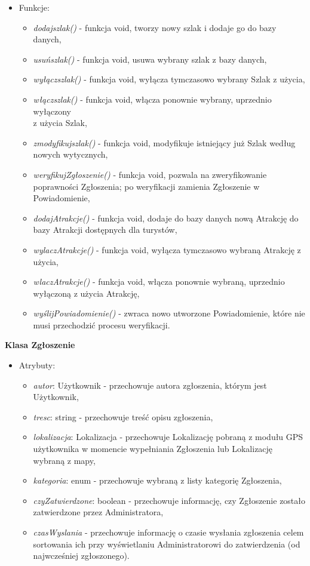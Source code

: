     \begin{itemize}
        \item []Funkcje:
        \begin{itemize}
            \item \textit{dodajszlak()} - funkcja void, tworzy nowy szlak i dodaje go do bazy danych,
            \item \textit{usuńszlak()} - funkcja void, usuwa wybrany szlak z bazy danych,
            \item \textit{wyłączszlak()} - funkcja void, wyłącza tymczasowo wybrany Szlak z użycia,
            \item \textit{włączszlak()} - funkcja void, włącza ponownie wybrany, uprzednio wyłączony \\z użycia Szlak,
            \item \textit{zmodyfikujszlak()} - funkcja void, modyfikuje istniejący już Szlak według nowych wytycznych,
            \item \textit{weryfikujZgłoszenie()} - funkcja void, pozwala na zweryfikowanie poprawności Zgłoszenia; po weryfikacji zamienia Zgłoszenie w Powiadomienie,
            \item \textit{dodajAtrakcje()} - funkcja void, dodaje do bazy danych nową Atrakcję do bazy Atrakcji dostępnych dla turystów,
            \item \textit{wylaczAtrakcje()} - funkcja void, wyłącza tymczasowo wybraną Atrakcję z użycia,
            \item \textit{wlaczAtrakcje()} - funkcja void, włącza ponownie wybraną, uprzednio wyłączoną z użycia Atrakcję,
            \item \textit{wyślijPowiadomienie()} - zwraca nowo utworzone Powiadomienie, które nie musi przechodzić procesu weryfikacji.
        \end{itemize}
    \end{itemize}
    \textbf{Klasa Zgłoszenie} 
    \begin{itemize}
        \item []Atrybuty:
        \begin{itemize}
            \item \textit{autor}: Użytkownik - przechowuje autora zgłoszenia, którym jest Użytkownik,
            \item \textit{tresc}: string - przechowuje treść opisu zgłoszenia,
            \item \textit{lokalizacja}: Lokalizacja - przechowuje Lokalizację pobraną z modułu GPS użytkownika w momencie wypełniania Zgłoszenia lub Lokalizację wybraną z mapy,
            \item \textit{kategoria}: enum - przechowuje wybraną z listy kategorię Zgłoszenia,
            \item \textit{czyZatwierdzone}: boolean - przechowuje informację, czy Zgłoszenie zostało zatwierdzone przez Administratora,
            \item \textit{czasWyslania} - przechowuje informację o czasie wysłania zgłoszenia celem sortowania ich przy wyświetlaniu Administratorowi do zatwierdzenia (od najwcześniej zgłoszonego).
        \end{itemize}
    \end{itemize}

